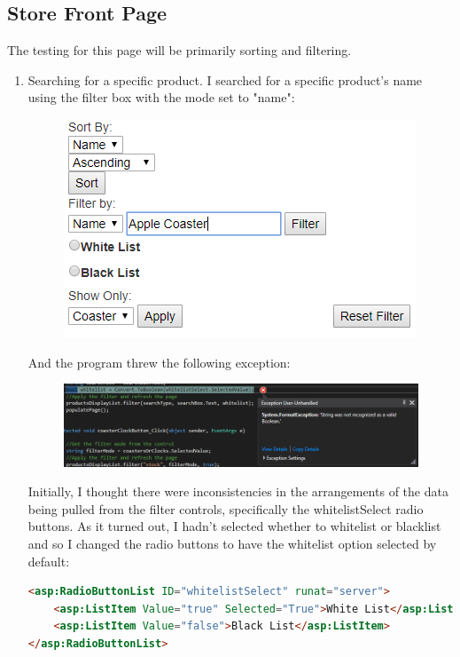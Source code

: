 ﻿\documentclass{article}
\begin{document}
    \subsection{Store Front Page}
    The testing for this page will be primarily sorting and filtering.
    \begin{enumerate}
        \item Searching for a specific product.
        I searched for a specific product's name using the filter box with the mode set to "name":
        \begin{figure}[H]
            \includegraphics{testing/products1.png}
            \centering
        \end{figure}
        And the program threw the following exception:
        \begin{figure}[H]
            \includegraphics{testing/products2.png}
            \centering
        \end{figure}
        Initially, I thought there were inconsistencies in the arrangements of the data being pulled from the filter controls, specifically the whitelistSelect radio buttons.
        As it turned out, I hadn't selected whether to whitelist or blacklist and so I changed the radio buttons to have the whitelist option selected by default:
        \begin{lstlisting}[language=HTML]
<asp:RadioButtonList ID="whitelistSelect" runat="server">
    <asp:ListItem Value="true" Selected="True">White List</asp:ListItem>
    <asp:ListItem Value="false">Black List</asp:ListItem>
</asp:RadioButtonList>
        \end{lstlisting}

\end{enumerate}
\end{document}
